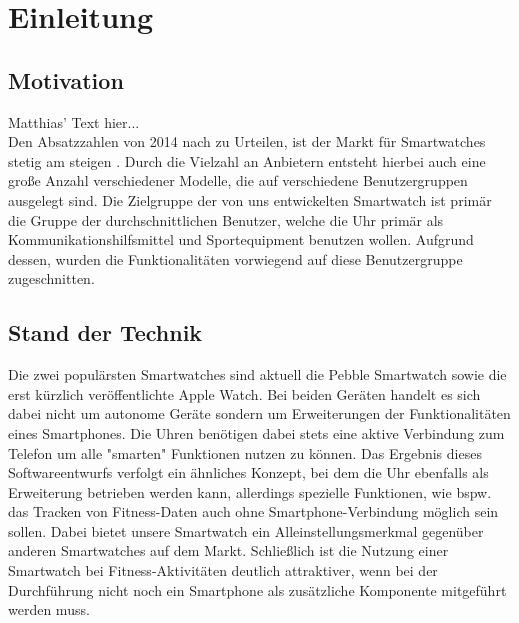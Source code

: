 \chapter{Einleitung}

\section{Motivation}
Matthias' Text hier...\\
Den Absatzzahlen von 2014 nach zu Urteilen, ist der Markt für Smartwatches stetig am steigen . Durch die Vielzahl an Anbietern entsteht hierbei auch eine große Anzahl verschiedener Modelle, die auf verschiedene Benutzergruppen ausgelegt sind. Die Zielgruppe der von uns entwickelten Smartwatch ist primär die Gruppe der durchschnittlichen Benutzer, welche die Uhr primär als Kommunikationshilfsmittel und Sportequipment benutzen wollen. Aufgrund dessen, wurden die Funktionalitäten  vorwiegend auf diese Benutzergruppe zugeschnitten.

\section{Stand der Technik}
Die zwei populärsten Smartwatches sind aktuell die Pebble Smartwatch sowie die erst kürzlich veröffentlichte Apple Watch. Bei beiden Geräten handelt es sich dabei nicht um autonome Geräte sondern um Erweiterungen der Funktionalitäten eines Smartphones. Die Uhren benötigen dabei stets eine aktive Verbindung zum Telefon um alle "smarten" Funktionen nutzen zu können. Das Ergebnis dieses Softwareentwurfs verfolgt ein ähnliches Konzept, bei dem die Uhr ebenfalls als Erweiterung betrieben werden kann, allerdings spezielle Funktionen, wie bspw. das Tracken von Fitness-Daten auch ohne Smartphone-Verbindung möglich sein sollen. Dabei bietet unsere Smartwatch ein Alleinstellungsmerkmal gegenüber anderen Smartwatches auf dem Markt. Schließlich ist die Nutzung einer Smartwatch bei Fitness-Aktivitäten deutlich attraktiver, wenn bei der Durchführung nicht noch ein Smartphone als zusätzliche Komponente mitgeführt werden muss.

